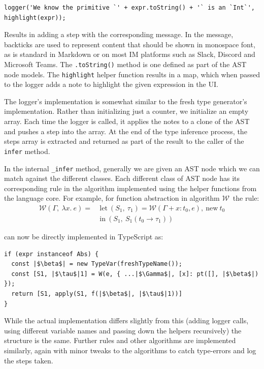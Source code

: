 \documentclass[a4paper,fleqn,oneside,12pt]{report}
\newcommand{\W}{$\mathcal{W}$}
\begin{document}
\begin{verbatim}
logger('We know the primitive `' + expr.toString() + '` is an `Int`', highlight(expr));
\end{verbatim}

Results in adding a step with the corresponding message. In the message, backticks are used to represent content that should be shown in monospace font, as is standard in Markdown or on most IM platforms such as Slack, Discord and Microsoft Teams. The \texttt{.toString()} method is one defined as part of the AST node models. The \texttt{highlight} helper function results in a map, which when passed to the logger adds a note to highlight the given expression in the UI.

The logger's implementation is somewhat similar to the fresh type generator's implementation. Rather than initializing just a counter, we initialize an empty array. Each time the logger is called, it applies the notes to a clone of the AST and pushes a step into the array. At the end of the type inference process, the steps array is extracted and returned as part of the result to the caller of the \texttt{infer} method.

In the internal \texttt{_infer} method, generally we are given an AST node which we can match against the different classes. Each different class of AST node has its corresponding rule in the algorithm implemented using the helper functions from the language core. For example, for function abstraction in algorithm \W\ the rule:
\begin{align*}
\mathcal{W}(\Gamma,\ \lambda x.\ e  ) =\ & \textrm{let}\ (S_1,\ \tau_1) = \mathcal{W}(\Gamma + x : t_0, e),\ \textrm{new}\ t_0\\
& \textrm{in}\ (S_1,\ S_1(t_0 \rightarrow \tau_1))
\end{align*}

can now be directly implemented in TypeScript as:

\begin{verbatim}
if (expr instanceof Abs) {
  const |$\beta$| = new TypeVar(freshTypeName());
  const [S1, |$\tau$|1] = W(e, { ...|$\Gamma$|, [x]: pt([], |$\beta$|) });
  return [S1, apply(S1, f(|$\beta$|, |$\tau$|1))]
}
\end{verbatim}
While the actual implementation differs slightly from this (adding logger calls, using different variable names and passing down the helpers recursively) the structure is the same. Further rules and other algorithms are implemented similarly, again with minor tweaks to the algorithms to catch type-errors and log the steps taken.
\end{document}
